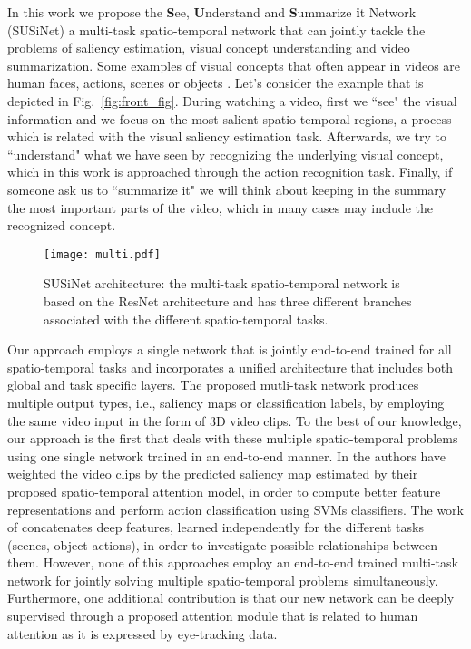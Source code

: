 \documentclass[10pt,twocolumn,letterpaper]{article}
\begin{document}
In this work we propose the \textbf{S}ee, \textbf{U}nderstand and \textbf{S}ummarize \textbf{i}t Network (SUSiNet) a multi-task spatio-temporal network that can jointly tackle the problems of saliency estimation, visual concept understanding and video summarization. Some examples of visual concepts that often appear in videos are human faces, actions, scenes or objects \cite{Bouritsas2018Multimodal,ray2018scenes}. Let's consider the example that is depicted in Fig.~\ref{fig:front_fig}. During watching a video, first we ``see" the visual information and we focus on the most salient spatio-temporal regions, a process which is related with the visual saliency estimation task. Afterwards, we try to ``understand" what we have seen by recognizing the underlying visual concept, which in this work is approached through the action recognition task. Finally, if someone ask us to ``summarize it" we will think about keeping in the summary the most important parts of the video, which in many cases may include the recognized concept.  

\begin{figure*}[t]
\begin{center}
\texttt{[image: multi.pdf]}
\end{center}
\caption{SUSiNet architecture: the multi-task spatio-temporal network is based on the ResNet architecture and has three different branches associated with the different spatio-temporal tasks.}
\label{fig:susi}
\end{figure*}

Our approach employs a single network that is jointly end-to-end trained for all spatio-temporal tasks and incorporates a unified architecture that includes both global and task specific layers. The proposed mutli-task network produces multiple output types, i.e., saliency maps or classification labels, by employing the same video input in the form of 3D video clips. To the best of our knowledge, our approach is the first that deals with these multiple spatio-temporal problems using one single network trained in an end-to-end manner. In \cite{bazzani2016recurrent} the authors have weighted the video clips by the predicted saliency map estimated by their proposed spatio-temporal attention model, in order to compute better feature representations and perform action classification using SVMs classifiers. The work of \cite{ray2018scenes} concatenates deep features, learned independently for the different tasks (scenes, object actions), in order to investigate possible relationships between them. However, none of this approaches employ an end-to-end trained multi-task network for jointly solving multiple spatio-temporal problems simultaneously. Furthermore, one additional contribution is that our new network can be deeply supervised through a proposed attention module that is related to human attention as it is expressed by eye-tracking data. 
\end{document}
